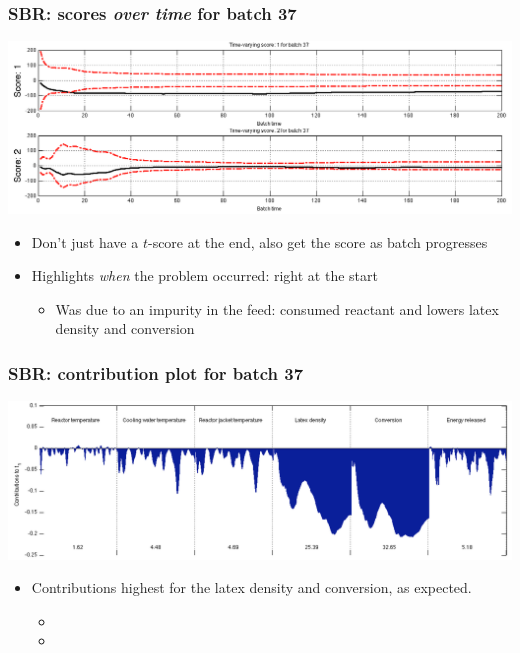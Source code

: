 \begin{frame}\frametitle{SBR: scores \emph{over time} for batch 37}
	
	\begin{center}
		\includegraphics[width=\textwidth]{images/sbr/SBR-time-evolving-scores.png}
	\end{center}
	
	\begin{itemize}
		\item	Don't just have a \( t \)-score at the end, also get the score as batch progresses
		
		\item	Highlights \emph{when} the problem occurred: right at the start
		
				\begin{itemize}
					\item	Was due to an impurity in the feed: consumed reactant and lowers latex density and conversion
				\end{itemize}
	\end{itemize}
	
	{}
\end{frame}

\begin{frame}\frametitle{SBR: contribution plot for batch 37}
	
	\begin{center}
		\includegraphics[width=\textwidth]{images/sbr/SBR-contributions-to-batch-37.png}
	\end{center}
	
	\begin{itemize}
		\item	Contributions highest for the latex density and conversion, as expected.
		
				\begin{itemize}
					\item	{}
					
					\item	{}
				\end{itemize}
	\end{itemize}
\end{frame}


